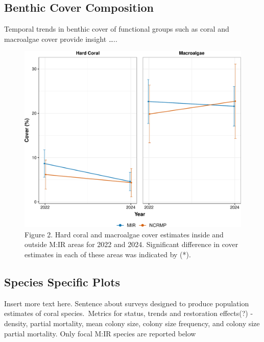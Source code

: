 \documentclass[
]{article}
\begin{document}
\hypertarget{benthic-cover-composition}{%
\subsection{Benthic Cover Composition}\label{benthic-cover-composition}}

Temporal trends in benthic cover of functional groups such as coral and
macroalgae cover provide insight \ldots..

\begin{figure}

{\centering \includegraphics{MIR_quarto_files/figure-pdf/fig_benthic_cover_data (OG)-1.pdf}

}

\caption{Figure 2. Hard coral and macroalgae cover estimates inside and
outside M:IR areas for 2022 and 2024. Significant difference in cover
estimates in each of these areas was indicated by (*).}

\end{figure}

\hypertarget{species-specific-plots}{%
\subsection{Species Specific Plots}\label{species-specific-plots}}

Insert more text here. Sentence about surveys designed to produce
population estimates of coral species.~Metrics for status, trends and
restoration effects(?) - density, partial mortality, mean colony size,
colony size frequency, and colony size partial mortality. Only focal
M:IR species are reported below
\end{document}
